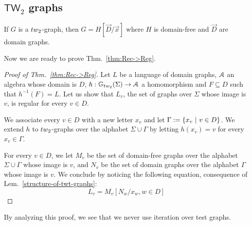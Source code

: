 \subsection{$\mathsf{TW}_2$ graphs}

\begin{lemma}\label{structure-of-twt-graphs}
If $G$ is a $\TWT$-graph, then $G=H[\vec{D}/\vec{x}]$ where $H$ is domain-free and $\vec{D}$ are domain graphs. 
\end{lemma}

Now we are ready to prove Thm.~\ref{thm:Rec->Reg}.
\begin{proof}[Proof of Thm.~\ref{thm:Rec->Reg}]
Let $L$ be a language of domain graphs, $\mathcal A$ an algebra whose domain is $D$, $h:\mathbb{G}_\TWT(\Sigma) \to \A$ a homomorphism and $F\subseteq D$ such that $h^{-1}(F)=L$. Let us show that $L_v$, the set of graphs over $\Sigma$ whose image  is $v$,  is regular for every $v\in D$. 
\medskip

We associate every $v\in D$ with a new letter $x_v$ and let  $\Gamma:=\left\{x_v\ | \ v\in D\right\}$.   We extend  $h$ to $\TWT$-graphs over the alphabet $\Sigma \cup \Gamma$ by letting $h(x_v)=v$ for every $x_v\in\Gamma$. 
\medskip

For every $v\in D$, we let $M_v$ be the set of domain-free graphs over the alphabet $\Sigma\cup \Gamma$ whose image is $v$, and $N_v$ be the set of domain graphs over the alphabet $\Gamma$ whose image is $v$. We conclude by noticing the following equation, consequence of Lem.~\ref{structure-of-twt-graphs}:
$$ L_v=M_v[N_w/x_w, w\in D]$$
\end{proof}
\begin{remark}
By analyzing this proof, we see that we never use iteration over test graphs. 
\end{remark}